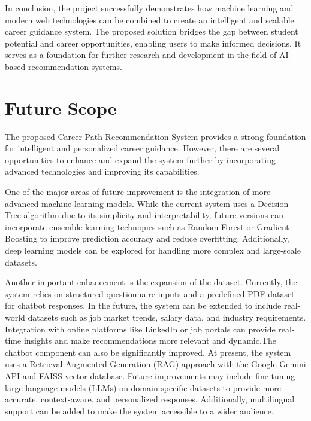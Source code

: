 \documentclass[12pt,a4paper]{report}
\begin{document}
{In conclusion, the project successfully demonstrates how machine learning and modern web technologies can be combined to create an intelligent and scalable career guidance system. The proposed solution bridges the gap between student potential and career opportunities, enabling users to make informed decisions. It serves as a foundation for further research and development in the field of AI-based recommendation systems.

\clearpage
\chapter{Future Scope}

\setlength{\parindent}{0pt}
\justifying

The proposed Career Path Recommendation System provides a strong foundation for intelligent and personalized career guidance. However, there are several opportunities to enhance and expand the system further by incorporating advanced technologies and improving its capabilities.

One of the major areas of future improvement is the integration of more advanced machine learning models. While the current system uses a Decision Tree algorithm due to its simplicity and interpretability, future versions can incorporate ensemble learning techniques such as Random Forest or Gradient Boosting to improve prediction accuracy and reduce overfitting. Additionally, deep learning models can be explored for handling more complex and large-scale datasets.

Another important enhancement is the expansion of the dataset. Currently, the system relies on structured questionnaire inputs and a predefined PDF dataset for chatbot responses. In the future, the system can be extended to include real-world datasets such as job market trends, salary data, and industry requirements. Integration with online platforms like LinkedIn or job portals can provide real-time insights and make recommendations more relevant and dynamic.The chatbot component can also be significantly improved. At present, the system uses a Retrieval-Augmented Generation (RAG) approach with the Google Gemini API and FAISS vector database. Future improvements may include fine-tuning large language models (LLMs) on domain-specific datasets to provide more accurate, context-aware, and personalized responses. Additionally, multilingual support can be added to make the system accessible to a wider audience.

}
\end{document}
